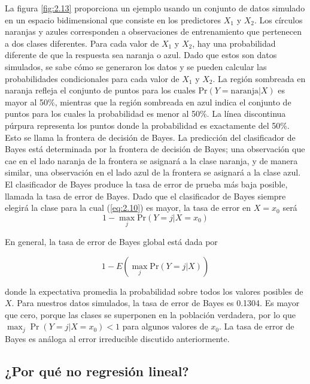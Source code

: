 La figura \ref{fig:2.13} proporciona un ejemplo usando un conjunto de datos simulado en un espacio bidimensional que consiste en los predictores $X_1$ y $X_2$. Los círculos naranjas y azules corresponden a observaciones de entrenamiento que pertenecen a dos clases diferentes. Para cada valor de $X_1$ y $X_2$, hay una probabilidad diferente de que la respuesta sea naranja o azul. Dado que estos son datos simulados, se sabe cómo se generaron los datos y se pueden calcular las probabilidades condicionales para cada valor de $X_1$ y $X_2$. La región sombreada en naranja refleja el conjunto de puntos para los cuales $\text{Pr}(Y = \text{naranja} | X)$ es mayor al 50\%, mientras que la región sombreada en azul indica el conjunto de puntos para los cuales la probabilidad es menor al 50\%. La línea discontinua púrpura representa los puntos donde la probabilidad es exactamente del 50\%. Esto se llama la frontera de decisión de Bayes. La predicción del clasificador de Bayes está determinada por la frontera de decisión de Bayes; una observación que cae en el lado naranja de la frontera se asignará a la clase naranja, y de manera similar, una observación en el lado azul de la frontera se asignará a la clase azul. \\

El clasificador de Bayes produce la tasa de error de prueba más baja posible, llamada la tasa de error de Bayes. Dado que el clasificador de Bayes siempre elegirá la clase para la cual (\ref{eq:2.10}) es mayor, la tasa de error en $X = x_0$ será 
\begin{equation}
1 - \max_j \text{Pr}(Y = j | X = x_0)
\end{equation}

\noindent En general, la tasa de error de Bayes global está dada por

\begin{equation}
1 - E\left(\max_j \text{Pr}(Y = j | X)\right)
\end{equation}

donde la expectativa promedia la probabilidad sobre todos los valores posibles de $X$. Para nuestros datos simulados, la tasa de error de Bayes es 0.1304. Es mayor que cero, porque las clases se superponen en la población verdadera, por lo que $\max_j \Pr(Y = j | X = x_0) < 1$ para algunos valores de $x_0$. La tasa de error de Bayes es análoga al error irreducible discutido anteriormente.

\subsection{¿Por qué no regresión lineal?}

